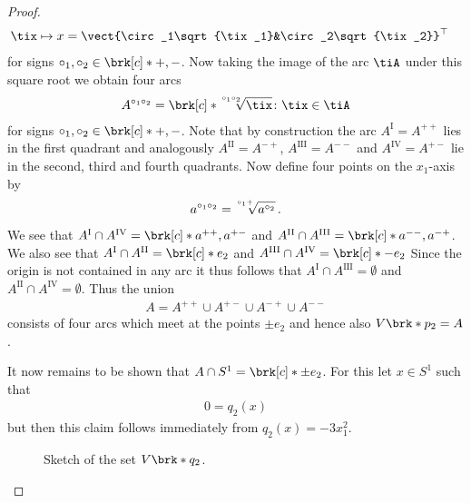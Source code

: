 \begin{proof}
\begin{align}
    \tix&\mapsto x=\vect{\circ_1\sqrt{\tix_1}&\circ_2\sqrt{\tix_2}}^\top
  \end{align}
  for signs $\circ_1,\circ_2\in\brk[c]*{+,-}$.
  Now taking the image of the arc $\tiA$ under this square root we obtain four arcs
  \begin{align*}
    A^{\circ_1\circ_2}=\brk[c]*{\sqrt[\leftroot{2}\uproot{4}\circ_1\circ_2]{\tix}\colon\tix\in \tiA}
  \end{align*}
  for signs $\circ_1,\circ_2\in\brk[c]*{+,-}$.
  Note that by construction the arc $A^\text{I}=A^{++}$ lies in the first quadrant and analogously
  $A^\text{II}=A^{-+}$, $A^\text{III}=A^{--}$ and $A^\text{IV}=A^{+-}$ lie in the second, third and fourth quadrants.
  Now define four points on the $x_1$-axis by
  \begin{align}
    a^{\circ_1\circ_2}=\sqrt[\leftroot{2}\uproot{4}\circ_1+]{a^{\circ_2}}\,.
  \end{align}
  We see that $A^\text{I}\cap A^\text{IV}=\brk[c]*{a^{++},a^{+-}}$ and
  $A^\text{II}\cap A^\text{III}=\brk[c]*{a^{--},a^{-+}}$.
  We also see that $A^\text{I}\cap A^\text{II}=\brk[c]*{e_2}$ and 
  $A^\text{III}\cap A^\text{IV}=\brk[c]*{-e_2}$
  Since the origin is not contained in any arc it thus follows that $A^\text{I}\cap A^\text{III}=\emptyset$ 
  and $A^\text{II}\cap A^\text{IV}=\emptyset$.
  Thus the union
  \begin{align}
    A=A^{++}\cup A^{+-}\cup A^{-+}\cup A^{--}
  \end{align}
  consists of four arcs which meet at the points $\pm e_2$ and hence also
  $V\brk*{p_2}=A$.

  It now remains to be shown that $A\cap S^1=\brk[c]*{\pm e_2}$.
  For this let $x\in S^1$ such that
  \begin{align}
    0=q_2(x)
  \end{align}
  but then this claim follows immediately from $q_2(x)=-3x_1^2$.

  \begin{figure}
    \centering
    
    \caption{Sketch of the set $V\brk*{q_2}$.}
    \label{fi:n3_polynomial_projectionComponentConics}
  \end{figure}
  


\end{proof}

